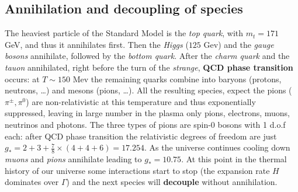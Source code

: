 \subsection{Annihilation and decoupling of species}
\label{sec:decoupling}
The heaviest particle of the Standard Model is the \emph{top quark}, with $m_t=171$ GeV, and thus it annihilates first. Then the \emph{Higgs} ($125$ Gev) and the \emph{gauge bosons} annihilate, followed by the \emph{bottom quark}. After the \emph{charm quark} and the \emph{tauon} annihilated, right before the turn of the \emph{strange}, \textbf{QCD phase transition} occurs: at $T\sim 150$ Mev the remaining quarks combine into baryons (protons, neutrons, \dots) and mesons (pions, \dots). All the resulting species, expect the pions ($\pi^\pm,\pi^0$) are non-relativistic at this temperature and thus exponentially suppressed, leaving in large number in the plasma only pions, electrons, muons, neutrinos and photons. The three types of pions are spin-0 bosons with 1 d.o.f each: after QCD phase transition the relativistic degrees of freedom are just $g_*=2+3+\tfrac{7}{8}\times(4+4+6)=17.254$. As the universe continues cooling down \emph{muons} and \emph{pions} annihilate leading to $g_*=10.75$. At this point in the thermal history of our universe some interactions start to stop (the expansion rate $H$ dominates over $\Gamma$) and the next species will \textbf{decouple} without annihilation.

